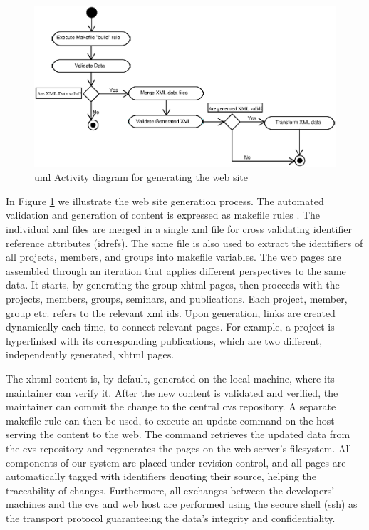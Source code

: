 \documentclass{elsart}
\begin{document}
\begin{figure}[h!]
\includegraphics[scale=0.6]{generate-web-site}
\caption{{\sc uml} Activity diagram for generating the web site}
\label{fig:generate-web-site}
\end{figure}

In Figure \ref{fig:generate-web-site} we illustrate the web site generation process.
The automated validation and generation of content is
expressed as makefile rules \cite{OTT91}.
The individual {\sc xml} files are merged in a
single {\sc xml} file for cross validating identifier
reference attributes ({\sc idref}s).
The same file is also used to extract the identifiers of
all projects, members, and groups into makefile
variables.
The web pages are assembled through an iteration that applies different perspectives
to the same data.
It starts, by generating the group {\sc xhtml} pages, then proceeds with the projects, members, groups, seminars, and publications.
Each project, member, group etc. refers to the relevant {\sc xml id}s.
Upon generation, links are created dynamically each time, to
connect relevant pages.
For example, a project is hyperlinked with its corresponding publications,
which are two different, independently generated, {\sc xhtml} pages.

The {\sc xhtml} content is, by default, generated on the
local machine, where its maintainer can verify it.
After the new content is validated and verified,
the maintainer can commit the change to the central {\sc cvs} repository. 
A separate makefile rule can then be used,
to execute an update command on the
host serving the content to the web.
The command retrieves the updated data from the {\sc cvs}
repository and regenerates the pages on the web-server's
filesystem.
All components of our system are placed under revision control, and
all pages are automatically tagged with identifiers
denoting their source, helping the traceability of changes.
Furthermore, all exchanges between the developers' machines and the
{\sc cvs} and web host are performed using the secure
shell ({\sc ssh}) as the transport protocol guaranteeing the data's integrity
and confidentiality.
\end{document}
